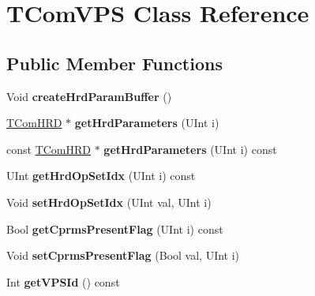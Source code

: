 \hypertarget{class_t_com_v_p_s}{}\section{T\+Com\+V\+PS Class Reference}
\label{class_t_com_v_p_s}
\subsection*{Public Member Functions}
\begin{DoxyCompactItemize}
\item 
\mbox{\label{class_t_com_v_p_s_aa7531f7c8d349e75be9458b4e496c5d4}} 
Void {\bfseries create\+Hrd\+Param\+Buffer} ()
\item 
\mbox{\label{class_t_com_v_p_s_a53fe30eb5e3a325a5fc4556c2a9c3eba}} 
\hyperlink{class_t_com_h_r_d}{T\+Com\+H\+RD} $\ast$ {\bfseries get\+Hrd\+Parameters} (U\+Int i)
\item 
\mbox{\label{class_t_com_v_p_s_a3c853cd7f269abb501f75da4c943e985}} 
const \hyperlink{class_t_com_h_r_d}{T\+Com\+H\+RD} $\ast$ {\bfseries get\+Hrd\+Parameters} (U\+Int i) const
\item 
\mbox{\label{class_t_com_v_p_s_aab88f219dbb32384588bbed481e7fab9}} 
U\+Int {\bfseries get\+Hrd\+Op\+Set\+Idx} (U\+Int i) const
\item 
\mbox{\label{class_t_com_v_p_s_a063fe63fc5081d90e84e6290053c2393}} 
Void {\bfseries set\+Hrd\+Op\+Set\+Idx} (U\+Int val, U\+Int i)
\item 
\mbox{\label{class_t_com_v_p_s_a71d8575e0e08a7bd6ace1c0edb78cda4}} 
Bool {\bfseries get\+Cprms\+Present\+Flag} (U\+Int i) const
\item 
\mbox{\label{class_t_com_v_p_s_af89c7cab00491964ec5558bebe4cee8f}} 
Void {\bfseries set\+Cprms\+Present\+Flag} (Bool val, U\+Int i)
\item 
\mbox{\label{class_t_com_v_p_s_a3e0dc8a28a790381d549798b2e768dd2}} 
Int {\bfseries get\+V\+P\+S\+Id} () const
\item 
\mbox{\label{class_t_com_v_p_s_a13ccb2088fe0d4609e16a1c2c3d032e4}} 

\end{DoxyCompactItemize}
